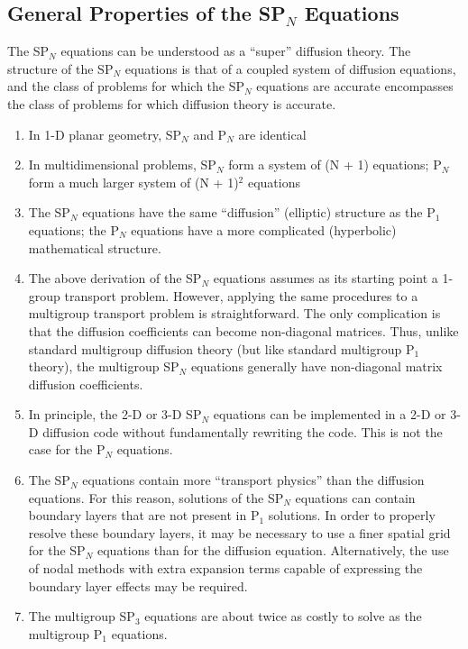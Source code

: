 \documentclass[12pt]{article}
\begin{document}
\subsection*{General Properties of the SP$_N$ Equations}

The SP$_N$ equations can be understood as a ``super'' diffusion theory.
The structure of the SP$_N$ equations is that of a coupled system of diffusion equations, and the class of problems for which the SP$_N$ equations are accurate encompasses the class of problems for which diffusion theory is accurate.

\begin{enumerate}
\item In 1-D planar geometry, SP$_N$ and P$_N$ are identical
\item In multidimensional problems, SP$_N$ form a system of (N + 1) equations; P$_N$ form a much larger system of (N + 1)$^2$ equations
\item The SP$_N$ equations have the same ``diffusion'' (elliptic) structure as the P$_1$ equations; the P$_N$ equations have a more complicated (hyperbolic) mathematical structure.
\item The above derivation of the SP$_N$ equations assumes as its starting point a 1-group transport problem.
However, applying the same procedures to a multigroup transport problem is straightforward.
The only complication is that the diffusion coefficients can become non-diagonal matrices.
Thus, unlike standard multigroup diffusion theory (but like standard multigroup P$_1$ theory), the multigroup SP$_N$ equations generally have non-diagonal matrix diffusion coefficients.
\item In principle, the 2-D or 3-D SP$_N$ equations can be implemented in a 2-D or 3-D diffusion code without fundamentally rewriting the code.
This is not the case for the P$_N$ equations.
\item The SP$_N$ equations contain more ``transport physics'' than the diffusion equations.
For this reason, solutions of the SP$_N$ equations can contain boundary layers that are not present in P$_1$ solutions.
In order to properly resolve these boundary layers, it may be necessary to use a finer spatial grid for the SP$_N$ equations than for the diffusion equation.
Alternatively, the use of nodal methods with extra expansion terms capable of expressing the boundary layer effects may be required.
\item The multigroup SP$_3$ equations are about twice as costly to solve as the multigroup P$_1$ equations.

\end{enumerate}
\end{document}
